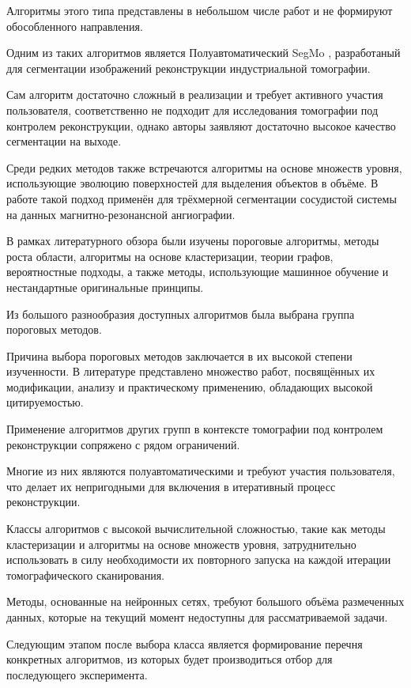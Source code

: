 Алгоритмы этого типа представлены в небольшом числе работ и не формируют обособленного направления.

Одним из таких алгоритмов является Полуавтоматический SegMo \cite{nagai2019segmo}, разработаный для сегментации изображений реконструкции индустриальной томографии.

Сам алгоритм достаточно сложный в реализации и требует активного участия пользователя, соответственно не подходит для исследования томографии под контролем реконструкции, однако авторы заявляют достаточно высокое качество сегментации на выходе.

Среди редких методов также встречаются алгоритмы на основе множеств уровня, использующие эволюцию поверхностей для выделения объектов в объёме. В работе \cite{farag20043d} такой подход применён для трёхмерной сегментации сосудистой системы на данных магнитно-резонансной ангиографии.

В рамках литературного обзора были изучены пороговые алгоритмы, методы роста области, алгоритмы на основе кластеризации, теории графов, вероятностные подходы, а также методы, использующие машинное обучение и нестандартные оригинальные принципы.

Из большого разнообразия доступных алгоритмов была выбрана группа пороговых методов.

Причина выбора пороговых методов заключается в их высокой степени изученности. В литературе представлено множество работ, посвящённых их модификации, анализу и практическому применению, обладающих высокой цитируемостью.

Применение алгоритмов других групп в контексте томографии под контролем реконструкции сопряжено с рядом ограничений. 

Многие из них являются полуавтоматическими и требуют участия пользователя, что делает их непригодными для включения в итеративный процесс реконструкции. 

Классы алгоритмов с высокой вычислительной сложностью, такие как методы кластеризации и алгоритмы на основе множеств уровня, затруднительно использовать в силу необходимости их повторного запуска на каждой итерации томографического сканирования. 

Методы, основанные на нейронных сетях, требуют большого объёма размеченных данных, которые на текущий момент недоступны для рассматриваемой задачи.

Следующим этапом после выбора класса является формирование перечня конкретных алгоритмов, из которых будет производиться отбор для последующего эксперимента.